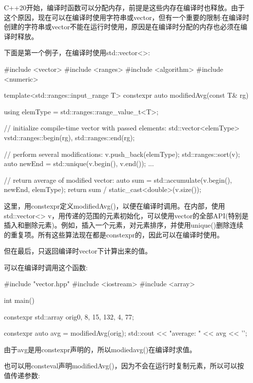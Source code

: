 
C++20开始，编译时函数可以分配内存，前提是这些内存在编译时也释放。由于这个原因，现在可以在编译时使用字符串或vector，但有一个重要的限制:在编译时创建的字符串或vector不能在运行时使用，原因是在编译时分配的内存也必须在编译时释放。


下面是第一个例子，在编译时使用std::vector<>:


\begin{cpp}
#include <vector>
#include <ranges>
#include <algorithm>
#include <numeric>

template<std::ranges::input_range T>
constexpr auto modifiedAvg(const T& rg)
{
	using elemType = std::ranges::range_value_t<T>;

	// initialize compile-time vector with passed elements:
	std::vector<elemType> v{std::ranges::begin(rg),
							std::ranges::end(rg)};

	// perform several modifications:
	v.push_back(elemType{});
	std::ranges::sort(v);
	auto newEnd = std::unique(v.begin(), v.end());
	...

	// return average of modified vector:
	auto sum = std::accumulate(v.begin(), newEnd,
								elemType{});
	return sum / static_cast<double>(v.size());
}
\end{cpp}

这里，用constexpr定义modifiedAvg()，以便在编译时调用。在内部，使用std::vector<> v，用传递的范围的元素初始化，可以使用vector的全部API(特别是插入和删除元素)。例如，插入一个元素，对元素排序，并使用unique()删除连续的重复项。所有这些算法现在都是constexpr的，因此可以在编译时使用。

但在最后，只返回编译时vector下计算出来的值。

可以在编译时调用这个函数:


\begin{cpp}
#include "vector.hpp"
#include <iostream>
#include <array>

int main()
{
	constexpr std::array orig{0, 8, 15, 132, 4, 77};

	constexpr auto avg = modifiedAvg(orig);
	std::cout << "average: " << avg << '\n';
}
\end{cpp}

由于avg是用constexpr声明的，所以modiedavg()在编译时求值。

也可以用consteval声明modifiedAvg()，因为不会在运行时复制元素，所以可以按值传递参数:

